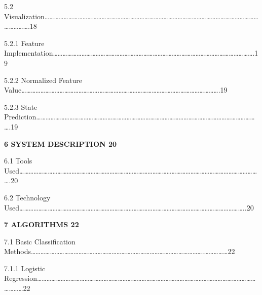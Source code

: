 \documentclass[a4paper,12pt]{article}
\begin{document}
5.2
Visualization\ldots\ldots\ldots\ldots\ldots\ldots\ldots\ldots\ldots\ldots\ldots\ldots\ldots\ldots\ldots\ldots\ldots\ldots\ldots\ldots\ldots\ldots\ldots\ldots\ldots\ldots\ldots\ldots\ldots\ldots\ldots\ldots\ldots\ldots\ldots\ldots\ldots\ldots\ldots\ldots\ldots\ldots\ldots\ldots\ldots\ldots\ldots\ldots\ldots\ldots.18

5.2.1 Feature
Implementation\ldots\ldots\ldots\ldots\ldots\ldots\ldots\ldots\ldots\ldots\ldots\ldots\ldots\ldots\ldots\ldots\ldots\ldots\ldots\ldots\ldots\ldots\ldots\ldots\ldots\ldots\ldots\ldots\ldots\ldots\ldots\ldots\ldots\ldots\ldots\ldots\ldots\ldots\ldots\ldots\ldots\ldots.19

5.2.2 Normalized Feature
Value\ldots\ldots\ldots\ldots\ldots\ldots\ldots\ldots\ldots\ldots\ldots\ldots\ldots\ldots\ldots\ldots.\ldots\ldots\ldots\ldots\ldots\ldots\ldots\ldots\ldots\ldots\ldots\ldots\ldots\ldots\ldots\ldots\ldots\ldots\ldots\ldots\ldots\ldots\ldots\ldots\ldots.19

5.2.3 State
Prediction\ldots\ldots\ldots\ldots\ldots\ldots\ldots\ldots\ldots\ldots\ldots\ldots\ldots\ldots\ldots\ldots\ldots\ldots\ldots\ldots\ldots\ldots\ldots\ldots\ldots\ldots\ldots\ldots\ldots\ldots\ldots\ldots\ldots\ldots\ldots\ldots\ldots\ldots\ldots\ldots\ldots\ldots\ldots\ldots\ldots\ldots\ldots.19

\textbf{6 SYSTEM DESCRIPTION 20}

6.1 Tools
Used\ldots\ldots\ldots\ldots\ldots\ldots\ldots\ldots\ldots\ldots\ldots\ldots\ldots\ldots\ldots\ldots\ldots\ldots\ldots\ldots\ldots\ldots\ldots\ldots\ldots\ldots\ldots\ldots\ldots\ldots\ldots\ldots\ldots\ldots\ldots\ldots\ldots\ldots\ldots\ldots\ldots\ldots\ldots\ldots\ldots\ldots\ldots\ldots\ldots\ldots\ldots.20

6.2 Technology
Used\ldots\ldots\ldots\ldots\ldots\ldots\ldots\ldots\ldots\ldots\ldots\ldots\ldots\ldots\ldots\ldots\ldots\ldots\ldots\ldots\ldots\ldots\ldots\ldots\ldots\ldots\ldots\ldots\ldots\ldots\ldots\ldots\ldots\ldots\ldots\ldots\ldots\ldots\ldots\ldots\ldots\ldots\ldots\ldots\ldots\ldots\ldots..20

\textbf{7 ALGORITHMS 22}

7.1 Basic Classification
Methods\ldots\ldots\ldots\ldots\ldots\ldots\ldots\ldots\ldots\ldots\ldots\ldots\ldots\ldots\ldots\ldots\ldots\ldots\ldots\ldots\ldots\ldots\ldots\ldots\ldots\ldots\ldots\ldots\ldots\ldots\ldots\ldots\ldots\ldots\ldots\ldots.\ldots\ldots\ldots\ldots\ldots22

7.1.1
Logistic Regression\ldots\ldots\ldots\ldots\ldots\ldots\ldots\ldots\ldots\ldots\ldots\ldots\ldots\ldots\ldots\ldots\ldots\ldots\ldots\ldots\ldots\ldots\ldots\ldots\ldots\ldots\ldots\ldots\ldots\ldots\ldots\ldots\ldots\ldots\ldots\ldots\ldots\ldots\ldots\ldots\ldots\ldots\ldots\ldots\ldots\ldots\ldots\ldots\ldots\ldots22
\end{document}
